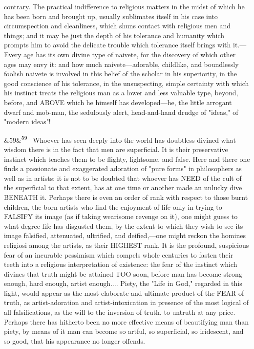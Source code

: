 \documentclass[12pt]{article}
\newcommand{\para}[1][]{\par\noindent\ifx&#1&\else\textsuperscript{\footnotesize #1}~\fi}
\begin{document}
contrary. The practical indifference to religious matters in the midst of which he has been born and brought up, usually sublimates itself in his case into circumspection and cleanliness, which shuns contact with religious men and things; and it may be just the depth of his tolerance and humanity which prompts him to avoid the delicate trouble which tolerance itself brings with it.---Every age has its own divine type of naivete, for the discovery of which other ages may envy it: and how much naivete---adorable, childlike, and boundlessly foolish naivete is involved in this belief of the scholar in his superiority, in the good conscience of his tolerance, in the unsuspecting, simple certainty with which his instinct treats the religious man as a lower and less valuable type, beyond, before, and ABOVE which he himself has developed---he, the little arrogant dwarf and mob-man, the sedulously alert, head-and-hand drudge of "ideas," of "modern ideas"!

\para[59] Whoever has seen deeply into the world has doubtless divined what wisdom there is in the fact that men are superficial. It is their preservative instinct which teaches them to be flighty, lightsome, and false. Here and there one finds a passionate and exaggerated adoration of "pure forms" in philosophers as well as in artists: it is not to be doubted that whoever has NEED of the cult of the superficial to that extent, has at one time or another made an unlucky dive BENEATH it. Perhaps there is even an order of rank with respect to those burnt children, the born artists who find the enjoyment of life only in trying to FALSIFY its image (as if taking wearisome revenge on it), one might guess to what degree life has disgusted them, by the extent to which they wish to see its image falsified, attenuated, ultrified, and deified,---one might reckon the homines religiosi among the artists, as their HIGHEST rank. It is the profound, suspicious fear of an incurable pessimism which compels whole centuries to fasten their teeth into a religious interpretation of existence: the fear of the instinct which divines that truth might be attained TOO soon, before man has become strong enough, hard enough, artist enough.... Piety, the "Life in God," regarded in this light, would appear as the most elaborate and ultimate product of the FEAR of truth, as artist-adoration and artist-intoxication in presence of the most logical of all falsifications, as the will to the inversion of truth, to untruth at any price. Perhaps there has hitherto been no more effective means of beautifying man than piety, by means of it man can become so artful, so superficial, so iridescent, and so good, that his appearance no longer offends.
\end{document}
